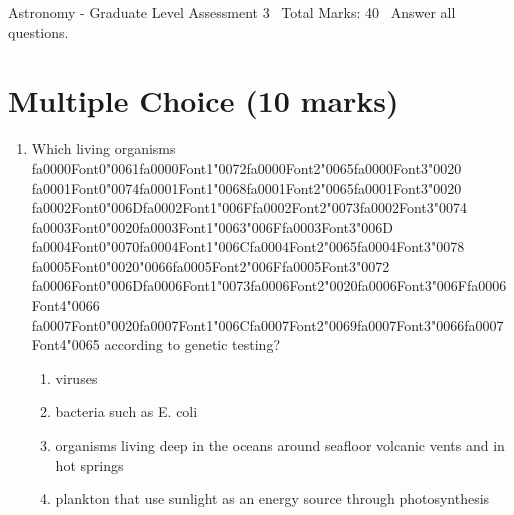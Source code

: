 \documentclass[12pt]{article}
\begin{document}
\begin{center}
Astronomy - Graduate Level Assessment 3 \
Total Marks: 40 \
Answer all questions.
\end{center}

\section*{Multiple Choice (10 marks)}
\begin{enumerate}[label=\arabic*.]
\item Which living organisms {\csname fa0000Font0\endcsname\char"0061}{\csname fa0000Font1\endcsname\char"0072}{\csname fa0000Font2\endcsname\char"0065}{\csname fa0000Font3\endcsname\char"0020} {\csname fa0001Font0\endcsname\char"0074}{\csname fa0001Font1\endcsname\char"0068}{\csname fa0001Font2\endcsname\char"0065}{\csname fa0001Font3\endcsname\char"0020} {\csname fa0002Font0\endcsname\char"006D}{\csname fa0002Font1\endcsname\char"006F}{\csname fa0002Font2\endcsname\char"0073}{\csname fa0002Font3\endcsname\char"0074} {\csname fa0003Font0\endcsname\char"0020}{\csname fa0003Font1\endcsname\char"0063}{\char"006F}{\csname fa0003Font3\endcsname\char"006D} {\csname fa0004Font0\endcsname\char"0070}{\csname fa0004Font1\endcsname\char"006C}{\csname fa0004Font2\endcsname\char"0065}{\csname fa0004Font3\endcsname\char"0078} {\csname fa0005Font0\endcsname\char"0020}{\char"0066}{\csname fa0005Font2\endcsname\char"006F}{\csname fa0005Font3\endcsname\char"0072} {\csname fa0006Font0\endcsname\char"006D}{\csname fa0006Font1\endcsname\char"0073}{\csname fa0006Font2\endcsname\char"0020}{\csname fa0006Font3\endcsname\char"006F}{\csname fa0006Font4\endcsname\char"0066} {\csname fa0007Font0\endcsname\char"0020}{\csname fa0007Font1\endcsname\char"006C}{\csname fa0007Font2\endcsname\char"0069}{\csname fa0007Font3\endcsname\char"0066}{\csname fa0007Font4\endcsname\char"0065} according to genetic
testing?
\begin{enumerate}[label=(\alph*)]
    \item viruses
    \item bacteria such as E. coli
    \item organisms living deep in the oceans around seafloor volcanic vents and in hot springs
    \item plankton that use sunlight as an energy source through photosynthesis
\end{enumerate}

\end{enumerate}
\end{document}
